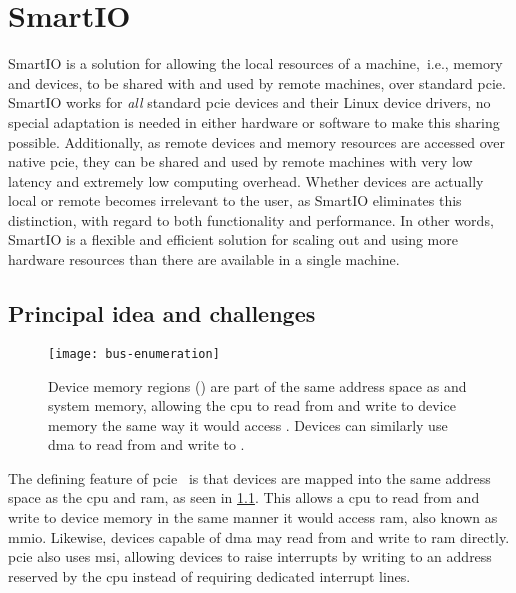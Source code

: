 \chapter{SmartIO}\label{chapter:smartio}
SmartIO is a solution for allowing the local resources of a machine,~i.e., memory and devices, to be shared with and used by remote machines, over standard \gls{pcie}.
%
SmartIO works for \emph{all} standard \gls{pcie} devices and their Linux device drivers, no special adaptation is needed in either hardware or software to make this sharing possible.
%
Additionally, as remote devices and memory resources are accessed over native \gls{pcie}, they can be shared and used by remote machines with very low latency and extremely low computing overhead.
%
Whether devices are actually local or remote becomes irrelevant to the user, as SmartIO eliminates this distinction, with regard to both functionality and performance.
%
In other words, SmartIO is a flexible and efficient solution for scaling out and using more hardware resources than there are available in a single machine.


\section{Principal idea and challenges}\label{sec:idea}
\begin{figure}
    \centering
    \texttt{[image: bus-enumeration]}
    \caption[Devices are part of the same address space as the  and system memory]
    {Device memory regions () are part of the same address space as  and system memory, allowing
    the \gls{cpu} to read from and write to device memory the same way it would access . Devices can similarly use \gls{dma} to read from and write to .}
    \label{fig:bus-enumeration}
\end{figure}
The defining feature of \gls{pcie}~\cite{spec:PCIe} is that devices are mapped into the same address space as the \gls{cpu} and \gls{ram}, as seen in \cref{fig:bus-enumeration}.
%
This allows a \gls{cpu} to read from and write to device memory in the same manner it would access \gls{ram}, also known as \gls{mmio}.
%
Likewise, devices capable of \gls{dma} may read from and write to \gls{ram} directly.
%
\Gls{pcie} also uses \gls{msi}, allowing devices to raise interrupts by writing to an address reserved by the \gls{cpu} instead of requiring dedicated interrupt lines.



